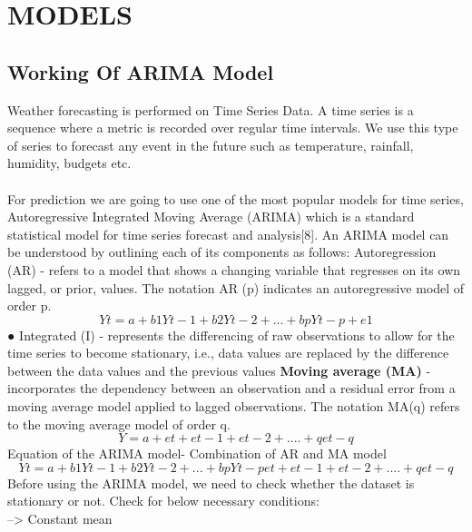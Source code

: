 \chapter{MODELS}
\label{chap:Proposed Methodology 1}
\section{Working Of ARIMA Model}
Weather forecasting is performed on Time Series Data. A time series is a sequence where a metric is recorded over regular time intervals. We use this type of series to forecast any event in the future such as temperature, rainfall, humidity, budgets etc.
\\
\\
For prediction we are going to use one of the most popular models for time series, Autoregressive Integrated Moving Average (ARIMA) which is a standard statistical model for time series forecast and analysis[8]. An ARIMA model can be understood by outlining each of its components as follows:
Autoregression (AR) - refers to a model that shows a changing variable that regresses on its own lagged, or prior, values. The notation AR (p) indicates an autoregressive model of order p.
\begin{equation}
      Yt = a + b1Yt-1 + b2Yt-2 + ...+bpYt-p + e1 
\end{equation}
● Integrated (I) - represents the differencing of raw observations to allow for the time series to become stationary, i.e., data values are replaced by the difference between the data values and the previous values
\textbf{Moving average (MA)} - incorporates the dependency between an observation and a residual error from a moving average model applied to lagged observations. The notation MA(q) refers to the moving average model of order q. 
\begin{equation}
   Y= a + et + et-1 + et-2+.... + qet-q
\end{equation}
Equation of the ARIMA model- Combination of AR and MA model 
\begin{equation}
   Yt = a + b1Yt-1 + b2Yt-2 + ...+bpYt-pet + et-1 + et-2+.... + qet-q 
\end{equation}
Before using the ARIMA model, we need to check whether the dataset is stationary or not. Check for below necessary conditions:
\\
 -->  Constant mean 
